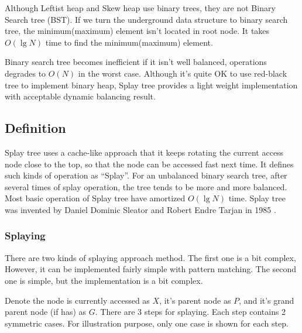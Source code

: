 \documentclass{article}
\begin{document}
Although Leftist heap and Skew heap use binary trees, they
are not Binary Search tree (BST). If we turn the underground
data structure to binary search tree, the minimum(maximum)
element isn't located in root node. It takes $O(\lg N)$ time
to find the minimum(maximum) element.

Binary search tree becomes inefficient if it isn't well
balanced, operations degrades to $O(N)$ in the worst case.
Although it's quite OK to use red-black tree to implement
binary heap, Splay tree provides a light weight implementation
with acceptable dynamic balancing result.

\subsection{Definition}

Splay tree uses a cache-like approach that it keeps rotating the current
access node close to the top, so that the node can be accessed fast
next time. It defines such kinds of operation as ``Splay''. For an
unbalanced binary search tree, after several times of splay operation, the
tree tends to be more and more balanced. Most basic operation of
Splay tree have amortized $O(\lg N)$ time. Splay tree was invented
by Daniel Dominic Sleator and Robert Endre Tarjan in 1985\cite{wiki-splay-tree}
\cite{self-adjusting-trees}.

\subsubsection{Splaying}

There are two kinds of splaying approach method. The first one is
a bit complex, However, it can be implemented fairly simple with
pattern matching. The second one is simple, but the implementation
is a bit complex.

Denote the node is currently accessed as $X$, it's parent node as $P$,
and it's grand parent node (if has) as $G$. There are 3 steps for
splaying. Each step contains 2 symmetric cases. For illustration
purpose, only one case is shown for each step.
\end{document}
